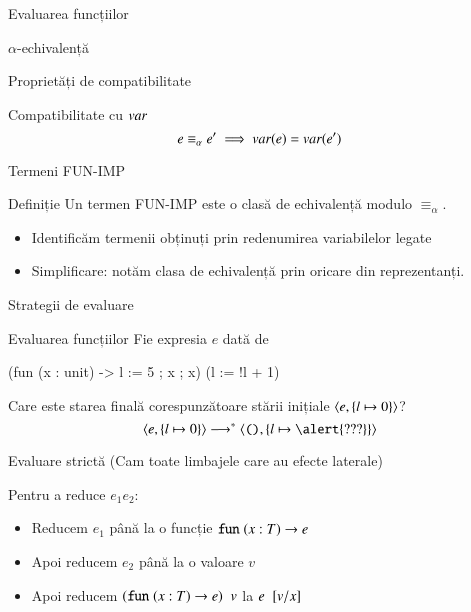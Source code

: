 \documentclass[xcolor=pdftex,romanian,colorlinks]{beamer}
\begin{document}
\begin{section}{Evaluarea funcțiilor}
\begin{subsection}{$\alpha$-echivalență}
\begin{frame}{Proprietăți de compatibilitate}
\vfill\begin{block}{Compatibilitate cu $\mathop{var}$}
\[e \equiv_\alpha e'  \implies \mathop{var}(e) = \mathop{var}(e')\]
\end{block}
\end{frame}

\begin{frame}{Termeni FUN-IMP}
  \begin{block}{Definiție}
    Un termen FUN-IMP este o clasă de echivalență modulo $\equiv_\alpha$.
  \end{block}

\vfill
\begin{itemize}
\item Identificăm termenii obținuți prin redenumirea variabilelor legate
\item Simplificare: notăm clasa de echivalență prin oricare din reprezentanți.
\end{itemize}
\end{frame}

\end{subsection}

\begin{subsection}{Strategii de evaluare}
\begin{frame}[fragile]{Evaluarea funcțiilor}
Fie expresia $e$ dată de 
\begin{asciiml}
(fun (x : unit) -> l := 5 ; x ; x) (l := !l + 1)
\end{asciiml}

Care este starea finală corespunzătoare stării inițiale ${\langle{e,\{l\mapsto 0\}}\rangle}$?
\[\c{e,\{l\mapsto 0\}} \longrightarrow^\ast \c{\Sskip, \{l\mapsto \alert{???}\}}\]

\end{frame}



\begin{frame}{Evaluare strictă (Cam toate limbajele care au efecte laterale)}
\begin{block}{}
Pentru a reduce $e_1 \mathrel{} e_2$:
\begin{itemize}
\item  Reducem $e_1$ până la o funcție
$\mathrel{\text{\ttfamily fun}} (x : T) \rightarrow e$
\item Apoi reducem $e_2$ până la o valoare $v$
\item Apoi reducem $(\mathrel{\text{\ttfamily fun}} (x : T) \rightarrow e)\mathrel{}v$ la $e\mathrel{}[v/x]$
\end{itemize}
\end{block}


\end{frame}
\end{subsection}
\end{section}
\end{document}
